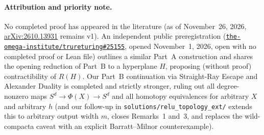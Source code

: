 \documentclass[11pt]{article}
\theoremstyle{plain}
\theoremstyle{definition}
\theoremstyle{remark}
\begin{document}
\paragraph{Attribution and priority note.}
No completed proof has appeared in the literature (as of November~26, 2026, \href{https://arxiv.org/abs/2610.13931}{arXiv:2610.13931} remains v1). An independent public preregistration (\href{https://github.com/the-omega-institute/trureturing/issues/25155}{\texttt{the-omega-\allowbreak institute/\allowbreak trureturing\#25155}}, opened November~1, 2026, open with no completed proof or Lean file) outlines a similar Part~A construction and shares the opening reduction of Part~B to a hyperplane $H$, proposing (without proof) contractibility of $R(H)$. Our Part~B continuation via Straight-Ray Escape and Alexander Duality is completed and strictly stronger, ruling out all degree-nonzero maps $S^d \to \Phi(X) \to S^d$ and all homotopy equivalences for arbitrary $X$ and arbitrary $h$ (and our follow-up in \texttt{solutions/relu\_topology\_ext/} extends this to arbitrary output width $m$, closes Remarks~1 and~3, and replaces the wild-compacta caveat with an explicit Barratt--Milnor counterexample).
\end{document}

